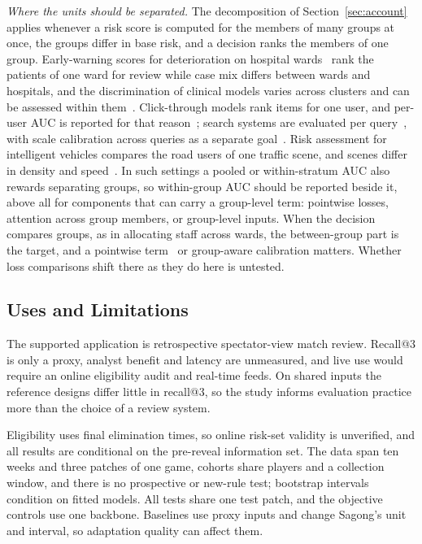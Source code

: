 \documentclass[sigconf,anonymous]{acmart}
\begin{document}
\emph{Where the units should be separated.} The decomposition of Section~\ref{sec:account} applies whenever a risk score is computed for the members of many groups at once, the groups differ in base risk, and a decision ranks the members of one group. Early-warning scores for deterioration on hospital wards~\cite{Churpek16} rank the patients of one ward for review while case mix differs between wards and hospitals, and the discrimination of clinical models varies across clusters and can be assessed within them~\cite{vanKlaveren14,Riley16}. Click-through models rank items for one user, and per-user AUC is reported for that reason~\cite{Zhou18}; search systems are evaluated per query~\cite{Jarvelin02}, with scale calibration across queries as a separate goal~\cite{Yan22,Bai23}. Risk assessment for intelligent vehicles compares the road users of one traffic scene, and scenes differ in density and speed~\cite{Lefevre14}. In such settings a pooled or within-stratum AUC also rewards separating groups, so within-group AUC should be reported beside it, above all for components that can carry a group-level term: pointwise losses, attention across group members, or group-level inputs. When the decision compares groups, as in allocating staff across wards, the between-group part is the target, and a pointwise term~\cite{Bai23} or group-aware calibration matters. Whether loss comparisons shift there as they do here is untested.

\subsection{Uses and Limitations}
\label{sec:discussion:limits}
The supported application is retrospective spectator-view match review. Recall@3 is only a proxy, analyst benefit and latency are unmeasured, and live use would require an online eligibility audit and real-time feeds. On shared inputs the reference designs differ little in recall@3, so the study informs evaluation practice more than the choice of a review system.

Eligibility uses final elimination times, so online risk-set validity is unverified, and all results are conditional on the pre-reveal information set. The data span ten weeks and three patches of one game, cohorts share players and a collection window, and there is no prospective or new-rule test; bootstrap intervals condition on fitted models. All tests share one test patch, and the objective controls use one backbone. Baselines use proxy inputs and change Sagong's unit and interval, so adaptation quality can affect them.
\end{document}
